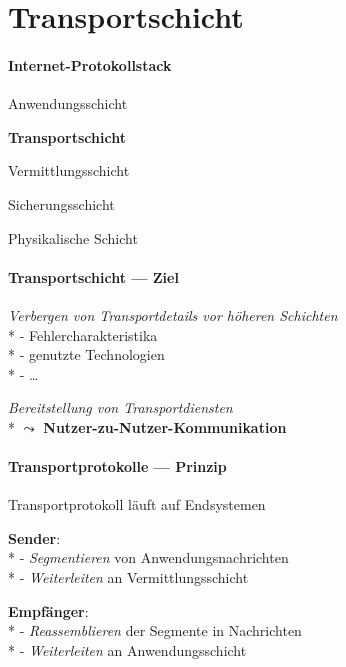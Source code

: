 \section{Transportschicht}

\paragraph{Internet-Protokollstack}
\begin{items}
  \item Anwendungsschicht
  \item \textbf{Transportschicht}
  \item Vermittlungsschicht
  \item Sicherungsschicht
  \item Physikalische Schicht
\end{items}

\paragraph{Transportschicht --- Ziel}
\begin{items}
  \item \emph{Verbergen von Transportdetails vor höheren Schichten} \\*
    - Fehlercharakteristika \\*
    - genutzte Technologien \\*
    - \dots
  \item \emph{Bereitstellung von Transportdiensten} \\*
    \( \leadsto \) \textbf{Nutzer-zu-Nutzer-Kommunikation}
\end{items}

\paragraph{Transportprotokolle --- Prinzip}
\begin{items}
  \item Transportprotokoll läuft auf Endsystemen
  \item \textbf{Sender}: \\*
    - \emph{Segmentieren} von Anwendungsnachrichten \\*
    - \emph{Weiterleiten} an Vermittlungsschicht
  \item \textbf{Empfänger}: \\*
    - \emph{Reassemblieren} der Segmente in Nachrichten \\*
    - \emph{Weiterleiten} an Anwendungsschicht
\end{items}

